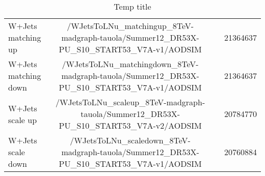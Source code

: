 \begin{sidewaystable}
\begin{center}
{\begin{tabular}{|l|c|c|c|}
\hline
	W+Jets matching up & /WJetsToLNu\_matchingup\_8TeV-madgraph-tauola/Summer12\_DR53X-PU\_S10\_START53\_V7A-v1/AODSIM & & 21364637\\
	W+Jets matching down & /WJetsToLNu\_matchingdown\_8TeV-madgraph-tauola/Summer12\_DR53X-PU\_S10\_START53\_V7A-v1/AODSIM & & 21364637\\
	W+Jets scale up & /WJetsToLNu\_scaleup\_8TeV-madgraph-tauola/Summer12\_DR53X-PU\_S10\_START53\_V7A-v2/AODSIM & & 20784770\\
	W+Jets scale down & /WJetsToLNu\_scaledown\_8TeV-madgraph-tauola/Summer12\_DR53X-PU\_S10\_START53\_V7A-v1/AODSIM & & 20760884\\
\hline
\end{tabular}
}
\end{center}
\caption{Temp title}
\label{tab-systsamples}
\end{sidewaystable}